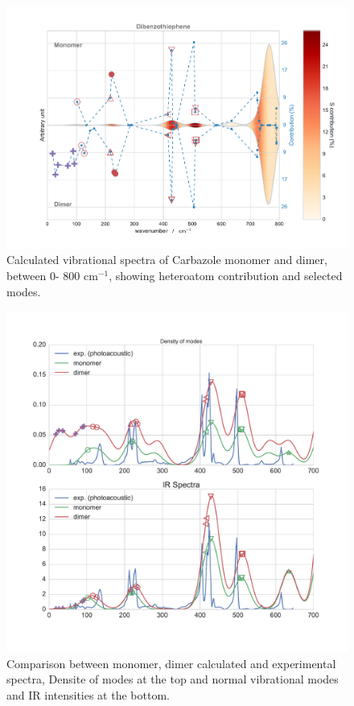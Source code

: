 	
		\begin{figure}[H]
			\begin{center}
				\includegraphics[scale=0.4]{image/P2-14}
			\end{center}
			\caption{Calculated vibrational spectra of Carbazole monomer and dimer, between 0- 800 cm$^{-1}$, showing heteroatom contribution and selected modes.} \label{figP2-14}
		\end{figure}
		
		
			\begin{figure}[H]
				\begin{center}
					\includegraphics[scale=0.31]{image/P2-15}
				\end{center}
				\caption{Comparison between monomer, dimer calculated and experimental spectra, Densite of modes at the top and normal vibrational modes and IR intensities at the bottom.} \label{figP2-15}
			\end{figure}
	

